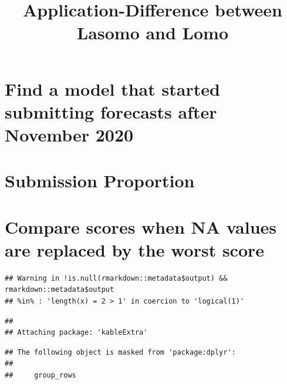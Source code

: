 \documentclass[
]{article}
\title{Application-Difference between Lasomo and Lomo}
\author{}
\date{\vspace{-2.5em}}
\begin{document}
\maketitle

\hypertarget{find-a-model-that-started-submitting-forecasts-after-november-2020}{%
\section{Find a model that started submitting forecasts after November
2020}\label{find-a-model-that-started-submitting-forecasts-after-november-2020}}

\hypertarget{submission-proportion}{%
\section{Submission Proportion}\label{submission-proportion}}

\hypertarget{compare-scores-when-na-values-are-replaced-by-the-worst-score}{%
\section{Compare scores when NA values are replaced by the worst
score}\label{compare-scores-when-na-values-are-replaced-by-the-worst-score}}

\newpage

\begin{verbatim}
## Warning in !is.null(rmarkdown::metadata$output) && rmarkdown::metadata$output
## %in% : 'length(x) = 2 > 1' in coercion to 'logical(1)'
\end{verbatim}

\begin{verbatim}
## 
## Attaching package: 'kableExtra'
\end{verbatim}

\begin{verbatim}
## The following object is masked from 'package:dplyr':
## 
##     group_rows
\end{verbatim}
\end{document}
